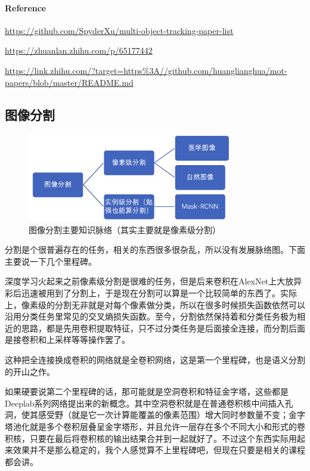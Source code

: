 \documentclass[lang=cn,11pt,a4paper]{elegant_template}
\begin{document}
\paragraph{Reference} 
\begin{enumerate}[label={[\arabic*]}, noitemsep]
\item \href{https://github.com/SpyderXu/multi-object-tracking-paper-list}{https://github.com/SpyderXu/multi-object-tracking-paper-list} 
\item \href{https://zhuanlan.zhihu.com/p/65177442}{https://zhuanlan.zhihu.com/p/65177442} 
\item \href{https://link.zhihu.com/?target=https\%3A//github.com/huanglianghua/mot-papers/blob/master/README.md}{https://link.zhihu.com/?target=https\%3A//github.com/huanglianghua/mot-papers/blob/master/README.md} 
\end{enumerate}

\subsection{图像分割}
\begin{figure}[htbp]
  \centering
  \includegraphics[width=0.8\textwidth]{image/cv_7.png}
  \caption{图像分割主要知识脉络（其实主要就是像素级分割）}
\end{figure}
分割是个很普遍存在的任务，相关的东西很多很杂乱，所以没有发展脉络图。下面主要说一下几个里程碑。

深度学习火起来之前像素级分割是很难的任务，但是后来卷积在AlexNet上大放异彩后迅速被用到了分割上，于是现在分割可以算是一个比较简单的东西了。实际上，像素级的分割无非就是对每个像素做分类，所以在很多时候损失函数依然可以沿用分类任务里常见的交叉熵损失函数。至今，分割依然保持着和分类任务极为相近的思路，都是先用卷积提取特征，只不过分类任务是后面接全连接，而分割后面是接卷积和上采样等等操作罢了。

这种把全连接换成卷积的网络就是全卷积网络，这是第一个里程碑，也是语义分割的开山之作。

\hfill

如果硬要说第二个里程碑的话，那可能就是空洞卷积和特征金字塔，这些都是Deeplab系列网络提出来的新概念。其中空洞卷积就是在普通卷积核中间插入孔洞，使其感受野（就是它一次计算能覆盖的像素范围）增大同时参数量不变；金字塔池化就是多个卷积层叠呈金字塔形，并且允许一层存在多个不同大小和形式的卷积核，只要在最后将卷积核的输出结果合并到一起就好了。不过这个东西实际用起来效果并不是那么稳定的，我个人感觉算不上里程碑吧，但现在只要是相关的课程都会讲。
\end{document}
